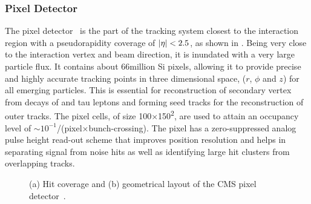 \subsubsection{Pixel Detector}
The pixel detector~\cite{Chatrchyan:2008aa,Karimaki:368412} is the part of the tracking system closest to the interaction region with a
 pseudorapidity coverage of $\lvert \eta \rvert<2.5$, as shown in \fig{\ref{fig:pixelDetector}}. Being very close to the interaction 
vertex and beam direction, it is inundated with a very large particle flux. It contains about 66\unit{million} Si pixels, allowing it to provide 
precise and highly accurate tracking points in three dimensional space, ($r$, $\phi$ and $z$) for all emerging particles. This is essential for 
reconstruction of secondary vertex from decays of \bquark and tau leptons and forming seed tracks for the reconstruction of outer tracks. The pixel 
cells, of size 100$\times$150\unit{^{2}}, are used to attain an occupancy level of $\sim 10^{-1}$/(pixel$\times$bunch-crossing). 
The pixel has a zero-suppressed analog pulse height read-out scheme that improves position resolution and helps in separating signal from noise hits 
as well as identifying large hit clusters from overlapping tracks. 
\begin{figure}[h!]
\centering
\hspace{1cm}
 \caption{(a) Hit coverage and (b) geometrical layout of the CMS pixel detector~\cite{Chatrchyan:2008aa}.}
\label{fig:pixelDetector}
\end{figure}

